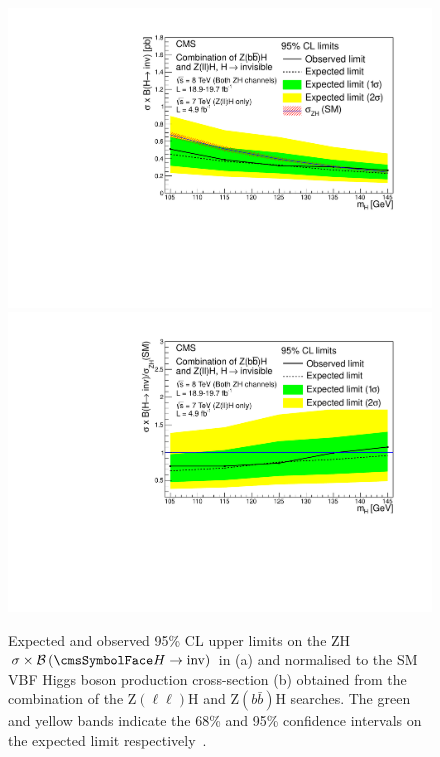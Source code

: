\begin{figure}
  \includegraphics[width=.65\largefigwidth]{plots/prompt/HIG-13-30-figs/zhxslimit.pdf}
  \includegraphics[width=.65\largefigwidth]{plots/prompt/HIG-13-30-figs/zhlimit.pdf}
  \caption[Expected and observed 95\% CL upper limits on the ZH $\sigma\times\BRinv$ in \pb (a) and normalised to the SM VBF Higgs boson production cross-section (b) obtained from the combination of the Z$(\ell\ell)$H and Z$(b\bar{b})$H searches. The green and yellow bands indicate the 68\% and 95\% confidence intervals on the expected limit respectively.]{Expected and observed 95\% CL upper limits on the ZH $\sigma\times\BRinv$ in \pb (a) and normalised to the SM VBF Higgs boson production cross-section (b) obtained from the combination of the Z$(\ell\ell)$H and Z$(b\bar{b})$H searches. The green and yellow bands indicate the 68\% and 95\% confidence intervals on the expected limit respectively~\cite{Chatrchyan:2014tja}.}
  \label{fig:zhcomb}
\end{figure}

